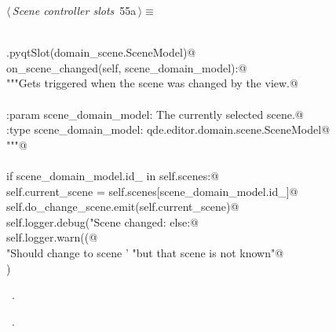 \documentclass[
    a4paper,      %
    10pt,         %
    openright,    %
    notitlepage,  %
    parskip=half, %
]{scrreprt}       %
\theoremstyle{definition}                    %
\begin{document}
\begin{flushleft} \small
\begin{minipage}{\linewidth}\label{scrap87}\raggedright\small
{} $\langle\,${\itshape Scene controller slots}\nobreak\ {\footnotesize {55a}}$\,\rangle\equiv$
\vspace{-1exm}
\begin{list}{}{} \item
\mbox{}\lstinline@@\\
\mbox{}\lstinline@QtCore.pyqtSlot(domain_scene.SceneModel)@\\
\mbox{}\lstinline@def on_scene_changed(self, scene_domain_model):@\\
\mbox{}\lstinline@    """Gets triggered when the scene was changed by the view.@\\
\mbox{}\lstinline@@\\
\mbox{}\lstinline@    :param scene_domain_model: The currently selected scene.@\\
\mbox{}\lstinline@    :type  scene_domain_model: qde.editor.domain.scene.SceneModel@\\
\mbox{}\lstinline@    """@\\
\mbox{}\lstinline@@\\
\mbox{}\lstinline@    if scene_domain_model.id_ in self.scenes:@\\
\mbox{}\lstinline@        self.current_scene = self.scenes[scene_domain_model.id_]@\\
\mbox{}\lstinline@        self.do_change_scene.emit(self.current_scene)@\\
\mbox{}\lstinline@        self.logger.debug("Scene changed: %s", self.current_scene)@\\
\mbox{}\lstinline@    else:@\\
\mbox{}\lstinline@        self.logger.warn((@\\
\mbox{}\lstinline@            "Should change to scene '%s', "@\\
\mbox{}\lstinline@            "but that scene is not known"@\\
\mbox{}\lstinline@        ) % scene_domain_model)@\\
\mbox{}\lstinline@@{\NWsep}
\end{list}
\vspace{-1.5ex}
\footnotesize
\begin{list}{}{\setlength{\itemsep}{-\parsep}\setlength{\itemindent}{-\leftmargin}}
\item \NWtxtMacroDefBy\ .
\item \NWtxtMacroRefIn\ .

\item{}
\end{list}
\end{minipage}\vspace{4ex}
\end{flushleft}
\end{document}
